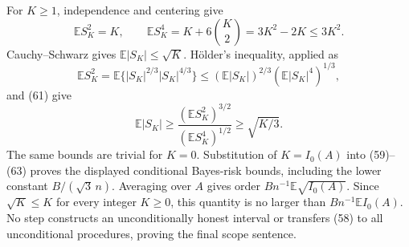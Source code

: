 For \(K\geq1\), independence and centering give
\[
 \mathbb ES_K^2=K,
 \qquad
 \mathbb ES_K^4=K+6{K\choose2}=3K^2-2K\leq3K^2.
\tag{61}
\]
Cauchy--Schwarz gives \(\mathbb E|S_K|\leq\sqrt K\).  H\"older's inequality, applied as
\[
 \mathbb ES_K^2
 =\mathbb E\{|S_K|^{2/3}|S_K|^{4/3}\}
 \leq(\mathbb E|S_K|)^{2/3}(\mathbb E|S_K|^4)^{1/3},
\tag{62}
\]
and (61) give
\[
 \mathbb E|S_K|
 \geq\frac{(\mathbb ES_K^2)^{3/2}}{(\mathbb ES_K^4)^{1/2}}
 \geq\sqrt{K/3}.
\tag{63}
\]
The same bounds are trivial for \(K=0\).  Substitution of \(K=I_0(A)\) into (59)--(63) proves the displayed conditional Bayes-risk bounds, including the lower constant \(B/(\sqrt3\,n)\).  Averaging over \(A\) gives order \(Bn^{-1}\mathbb E\sqrt{I_0(A)}\).  Since \(\sqrt K\leq K\) for every integer \(K\geq0\), this quantity is no larger than \(Bn^{-1}\mathbb EI_0(A)\).  No step constructs an unconditionally honest interval or transfers (58) to all unconditional procedures, proving the final scope sentence.